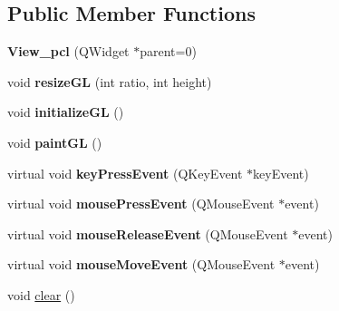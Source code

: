 \subsection*{Public Member Functions}
\begin{DoxyCompactItemize}
\item 
\hypertarget{classView__pcl_a7b69a39591374ced8ce47dfec309fdeb}{{\bfseries View\-\_\-pcl} (Q\-Widget $\ast$parent=0)}\label{classView__pcl_a7b69a39591374ced8ce47dfec309fdeb}

\item 
\hypertarget{classView__pcl_a51b12206778f93628545cb35c0df1a0e}{void {\bfseries resize\-G\-L} (int ratio, int height)}\label{classView__pcl_a51b12206778f93628545cb35c0df1a0e}

\item 
\hypertarget{classView__pcl_aa1ce55fc6eee5a8701fe1337d9798e6c}{void {\bfseries initialize\-G\-L} ()}\label{classView__pcl_aa1ce55fc6eee5a8701fe1337d9798e6c}

\item 
\hypertarget{classView__pcl_a421a85e2accc0ca3456210a467abe4a3}{void {\bfseries paint\-G\-L} ()}\label{classView__pcl_a421a85e2accc0ca3456210a467abe4a3}

\item 
\hypertarget{classView__pcl_ada831985f6aa0e7387a397790344d5c2}{virtual void {\bfseries key\-Press\-Event} (Q\-Key\-Event $\ast$key\-Event)}\label{classView__pcl_ada831985f6aa0e7387a397790344d5c2}

\item 
\hypertarget{classView__pcl_abb0ce71258b659307a2061f19fbb7492}{virtual void {\bfseries mouse\-Press\-Event} (Q\-Mouse\-Event $\ast$event)}\label{classView__pcl_abb0ce71258b659307a2061f19fbb7492}

\item 
\hypertarget{classView__pcl_ad6d04640841f88e05dc4c7c0e7f836a9}{virtual void {\bfseries mouse\-Release\-Event} (Q\-Mouse\-Event $\ast$event)}\label{classView__pcl_ad6d04640841f88e05dc4c7c0e7f836a9}

\item 
\hypertarget{classView__pcl_ae2a1385eb0fb5cfbe9f9fe5b20c5e72c}{virtual void {\bfseries mouse\-Move\-Event} (Q\-Mouse\-Event $\ast$event)}\label{classView__pcl_ae2a1385eb0fb5cfbe9f9fe5b20c5e72c}

\item 
\hypertarget{classView__pcl_ac5dfc49601a4752d9881b01edd5eb3a3}{void \hyperlink{classView__pcl_ac5dfc49601a4752d9881b01edd5eb3a3}{clear} ()}\label{classView__pcl_ac5dfc49601a4752d9881b01edd5eb3a3}


\end{DoxyCompactItemize}
